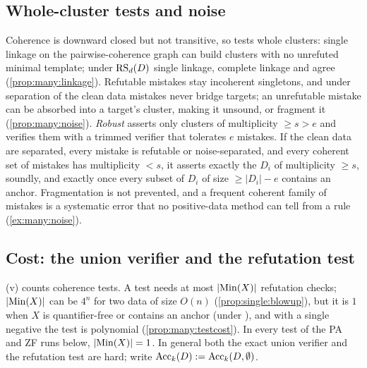\subsection{Whole-cluster tests and noise}\label{sec:many:linkage}

Coherence is downward closed but not transitive, so \DTRC{} tests whole clusters: single linkage on the
pairwise-coherence graph can build clusters with no unrefuted minimal template; under $\mathrm{RS}_d(D)$ single linkage, complete
linkage and \DTRC{} agree (\cref{prop:many:linkage}). Refutable mistakes stay incoherent singletons, and under separation
of the clean data mistakes never bridge targets; an unrefutable mistake can be absorbed into a target's cluster, making it
unsound, or fragment it (\cref{prop:many:noise}). \emph{Robust} \DTRC{} asserts only clusters of multiplicity $\ge s>e$
and verifies them with a trimmed verifier that tolerates $e$ mistakes. If the clean data are separated, every mistake is
refutable or noise-separated, and every coherent set of mistakes has multiplicity $<s$, it asserts exactly the $D_i$ of
multiplicity $\ge s$, soundly, and exactly once every subset of $D_i$ of size $\ge|D_i|-e$ contains an anchor.
Fragmentation is not prevented, and a frequent coherent family of mistakes is a systematic error that no positive-data
method can tell from a rule (\cref{ex:many:noise}).

\subsection{Cost: the union verifier and the refutation test}\label{sec:many:cost}

(v) counts coherence tests. A test needs at most $|\mathrm{Min}(X)|$ refutation checks; $|\mathrm{Min}(X)|$ can be
$4^n$ for two data of size $O(n)$ (\cref{prop:single:blowup}), but it is $1$ when $X$ is quantifier-free or contains an
anchor (under \Rich), and with a single negative the test is polynomial (\cref{prop:many:testcost}). In every test of the
PA and ZF runs below, $|\mathrm{Min}(X)|=1$. In general both the exact union verifier and the refutation test are hard; write
$\mathrm{Acc}_k(D):=\mathrm{Acc}_k(D,\emptyset)$.

